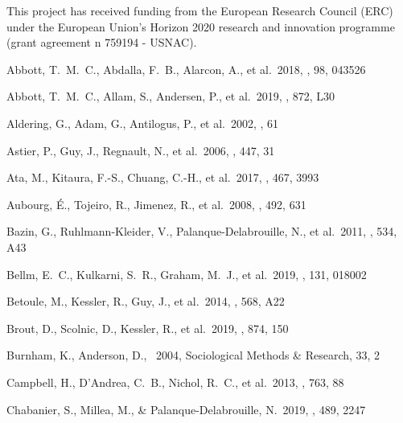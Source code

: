 \documentclass[]{aa} %
\begin{document}
\begin{acknowledgements}
    This project has received funding from the European Research Council (ERC)
    under the European Union's Horizon 2020 research and innovation programme
    (grant agreement n 759194 - USNAC).
\end{acknowledgements}

\begin{thebibliography}{} 
 Abbott, T.~M.~C., Abdalla, F.~B., Alarcon, A., et al.\ 2018, \prd, 98, 043526

 Abbott, T.~M.~C., Allam, S., Andersen, P., et al.\ 2019, \apjl, 872, L30

 Aldering, G., Adam, G., Antilogus, P., et al.\ 2002, \procspie, 61

 Astier, P., Guy, J., Regnault, N., et al.\ 2006, \aap, 447, 31


 Ata, M., Kitaura, F.-S., Chuang, C.-H., et al.\ 2017, \mnras, 467, 3993

 Aubourg, {\'E}.,
  Tojeiro, R., Jimenez, R., et al.\ 2008, \aap, 492, 631 


 Bazin, G., Ruhlmann-Kleider, V., Palanque-Delabrouille, N., et al.\ 2011, \aap, 534, A43

 Bellm, E.~C., Kulkarni, S.~R., Graham, M.~J., et al.\ 2019, \pasp, 131, 018002

 Betoule, M., Kessler, R., Guy, J., et al.\ 2014, \aap, 568, A22

 Brout, D., Scolnic, D., Kessler, R., et al.\ 2019, \apj, 874, 150

 Burnham, K., Anderson, D., \
2004, Sociological Methods \& Research, 33, 2

 Campbell, H., D'Andrea, C.~B., Nichol, R.~C., et al.\ 2013, \apj, 763, 88


 Chabanier, S., Millea, M., \& Palanque-Delabrouille, N.\ 2019, \mnras, 489, 2247


\end{thebibliography}
\end{document}
